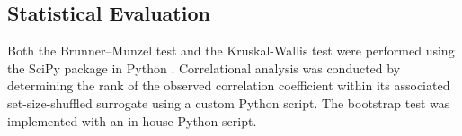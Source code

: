 \subsection{Statistical Evaluation}
Both the Brunner--Munzel test and the Kruskal-Wallis test were performed using the SciPy package in Python \cite{virtanen_scipy_2020}. Correlational analysis was conducted by determining the rank of the observed correlation coefficient within its associated set-size-shuffled surrogate using a custom Python script. The bootstrap test was implemented with an in-house Python script.
\label{sec:methods}